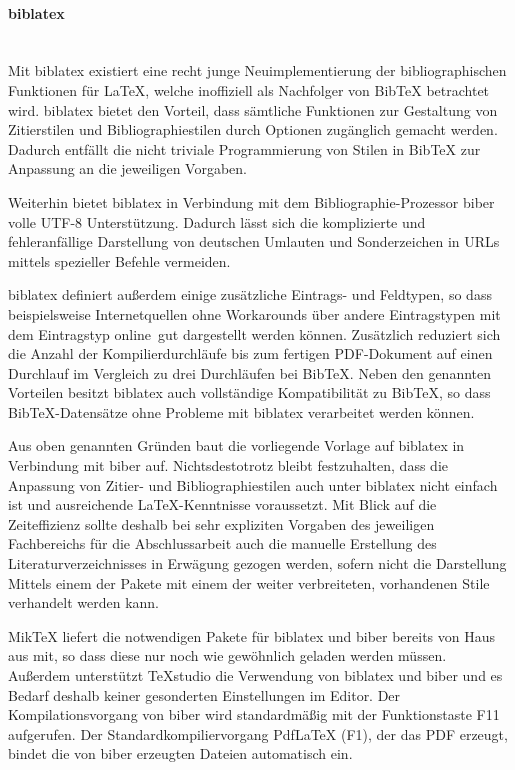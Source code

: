 \paragraph{biblatex}\noindent\\
Mit biblatex existiert eine recht junge Neuimplementierung der bibliographischen Funktionen für \LaTeX, welche inoffiziell als Nachfolger von BibTeX betrachtet wird. biblatex bietet den Vorteil, dass sämtliche Funktionen zur Gestaltung von Zitierstilen und Bibliographiestilen durch Optionen zugänglich gemacht werden. Dadurch entfällt die nicht triviale Programmierung von Stilen in BibTeX zur Anpassung an die jeweiligen Vorgaben.

Weiterhin bietet biblatex in Verbindung mit dem Bibliographie-Prozessor biber volle UTF-8 Unterstützung. Dadurch lässt sich die komplizierte und fehleranfällige Darstellung von deutschen Umlauten und Sonderzeichen in URLs mittels spezieller Befehle vermeiden.

biblatex definiert außerdem einige zusätzliche Eintrags- und Feldtypen, so dass beispielsweise Internetquellen ohne Workarounds über andere Eintragstypen mit dem Eintragstyp \glqq online\grqq\ gut dargestellt werden können. Zusätzlich reduziert sich die Anzahl der Kompilierdurchläufe bis zum fertigen PDF-Dokument auf einen Durchlauf im Vergleich zu drei Durchläufen bei BibTeX. Neben den genannten Vorteilen besitzt biblatex auch vollständige Kompatibilität zu BibTeX, so dass BibTeX-Datensätze ohne Probleme mit biblatex verarbeitet werden können.

Aus oben genannten Gründen baut die vorliegende Vorlage auf biblatex in Verbindung mit biber auf.
Nichtsdestotrotz bleibt festzuhalten, dass die Anpassung von Zitier- und Bibliographiestilen auch unter biblatex nicht einfach ist und ausreichende \LaTeX-Kenntnisse voraussetzt. Mit Blick auf die Zeiteffizienz sollte deshalb bei sehr expliziten Vorgaben des jeweiligen Fachbereichs für die Abschlussarbeit auch die manuelle Erstellung des Literaturverzeichnisses in Erwägung gezogen werden, sofern nicht die Darstellung Mittels einem der Pakete mit einem der weiter verbreiteten, vorhandenen Stile verhandelt werden kann.

MikTeX liefert die notwendigen Pakete für biblatex und biber bereits von Haus aus mit, so dass diese nur noch wie gewöhnlich geladen werden müssen. Außerdem unterstützt TeXstudio die Verwendung von biblatex und biber und es Bedarf deshalb keiner gesonderten Einstellungen im Editor. Der Kompilationsvorgang von biber wird standardmäßig mit der Funktionstaste F11 aufgerufen. Der Standardkompiliervorgang PdfLaTeX (F1), der das PDF erzeugt, bindet die von biber erzeugten Dateien automatisch ein.

